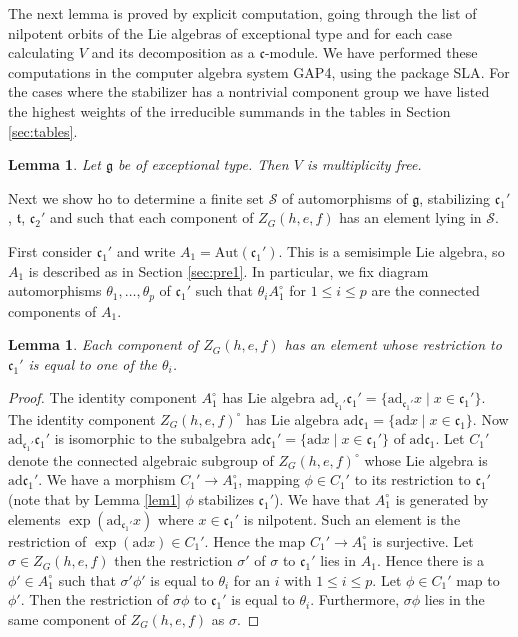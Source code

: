 \documentclass[a4paper,10pt]{amsart}
\newcommand{\mf}{\mathfrak}
\newcommand{\g}{\mf{g}}
\renewcommand{\c}{\mf{c}}
\newcommand{\ttt}{\mf{t}}
\newcommand{\ad}{\mathrm{ad}}
\newcommand{\Aut}{\mathrm{Aut}}
\numberwithin{equation}{section}
\newtheorem{lemma}[theorem]{Lemma}
\theoremstyle{remark}
\theoremstyle{remark}
\begin{document}
The next lemma is proved by explicit computation, going through the list of
nilpotent orbits of the Lie algebras of exceptional type and for each
case calculating $V$ and its decomposition as a $\c$-module. We have performed
these computations in the computer algebra system {\sf GAP}4, using the
package {\sf SLA}. For the cases
where the stabilizer has a nontrivial component group we have listed the
highest weights of the irreducible summands in the tables in Section
\ref{sec:tables}.

\begin{lemma}\label{lem3}
Let $\g$ be of exceptional type. Then $V$ is multiplicity free.
\end{lemma}

Next we show ho to determine a finite set $\mathcal{S}$
of automorphisms of $\g$,
stabilizing $\c_1'$, $\ttt$, $\c_2'$ and such that each component of $Z_G(h,e,f)$
has an element lying in $\mathcal{S}$.

First consider $\c_1'$ and write $A_1=\Aut(\c_1')$.
This is a semisimple Lie algebra, so $A_1$ is described as in Section
\ref{sec:pre1}. In particular, we fix diagram automorphisms $\theta_1,\ldots,
\theta_p$ of $\c_1'$ such that $\theta_i A_1^\circ$ for $1\leq i\leq p$ are
the connected components of $A_1$.

\begin{lemma}\label{lem4}
Each component of $Z_G(h,e,f)$ has an element whose restriction to $\c_1'$ is
equal to one of the $\theta_i$.   
\end{lemma}

\begin{proof}
The identity component $A_1^\circ$ has Lie algebra
$\ad_{\c_1'} \c_1' = \{\ad_{\c_1'} x \mid x\in \c_1'\}$. The identity component
$Z_G(h,e,f)^\circ$ has Lie algebra $\ad \c_1 = \{ \ad x \mid x\in \c_1\}$.
Now $\ad_{\c_1'} \c_1'$ is isomorphic to the subalgebra $\ad \c_1' = \{ \ad x \mid
x\in \c_1'\}$ of $\ad \c_1$. Let $C_1'$ denote the connected algebraic subgroup
of $Z_G(h,e,f)^\circ$ whose Lie algebra is $\ad \c_1'$. We have a morphism
$C_1'\to
A_1^\circ$, mapping $\phi\in C_1'$ to its restriction to $\c_1'$ (note that
by Lemma \ref{lem1} $\phi$ stabilizes $\c_1'$). We have that $A_1^\circ$ is
generated by elements $\exp(\ad_{\c_1'} x)$ where $x\in \c_1'$ is nilpotent.
Such an element is the restriction of $\exp(\ad x) \in C_1'$. Hence the map
$C_1'\to A_1^\circ$ is surjective. Let $\sigma\in Z_G(h,e,f)$ then
the restriction $\sigma'$ of $\sigma$ to $\c_1'$ lies in $A_1$. Hence there is a
$\phi'\in A_1^\circ$ such that $\sigma'\phi'$ is equal to $\theta_i$ for an $i$
with $1\leq i\leq p$. Let $\phi\in C_1'$ map to $\phi'$. Then the restriction
of $\sigma\phi$ to $\c_1'$ is equal to $\theta_i$. Furthermore, $\sigma\phi$
lies in the same component of $Z_G(h,e,f)$ as $\sigma$. 
\end{proof}
\end{document}
